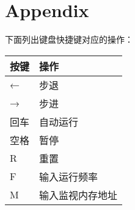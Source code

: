 \documentclass[12pt]{article}
\begin{document}
\section{Appendix}

下面列出键盘快捷键对应的操作：

\hspace{20pt}

\begin{table}[h]
\begin{tabular}{|l|l|}
\hline
{\bf 按键} & {\bf 操作} \\ \hline
←        & 步退       \\ \hline
→        & 步进       \\ \hline
回车       & 自动运行     \\ \hline
空格       & 暂停       \\ \hline
R        & 重置       \\ \hline
F        & 输入运行频率   \\ \hline
M        & 输入监视内存地址 \\ \hline
\end{tabular}
\end{table}
\end{document}
